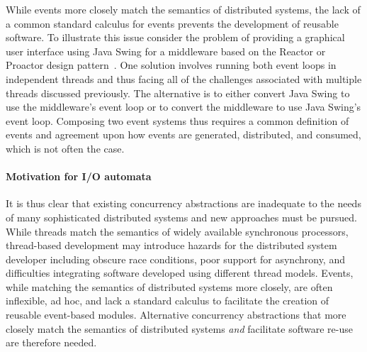 While events more closely match the semantics of distributed systems, the lack of a common standard calculus for events prevents the development of reusable software.
To illustrate this issue consider the problem of providing a graphical user interface using Java Swing for a middleware based on the Reactor or Proactor design pattern~\cite{schmidt2000pattern}.
One solution involves running both event loops in independent threads and thus facing all of the challenges associated with multiple threads discussed previously.
The alternative is to either convert Java Swing to use the middleware's event loop or to convert the middleware to use Java Swing's event loop.
Composing two event systems thus requires a common definition of events and agreement upon how events are generated, distributed, and consumed, which is not often the case.

\paragraph*{Motivation for I/O automata}
It is thus clear that existing concurrency abstractions are inadequate to the needs of many sophisticated distributed systems and new approaches must be pursued.
While threads match the semantics of widely available synchronous processors, thread-based development may introduce hazards for the distributed system developer including obscure race conditions, poor support for asynchrony, and difficulties integrating software developed using different thread models.
Events, while matching the semantics of distributed systems more closely, are often inflexible, ad hoc, and lack a standard calculus to facilitate the creation of reusable event-based modules.
Alternative concurrency abstractions that more closely match the semantics of distributed systems \emph{and} facilitate software re-use are therefore needed.


